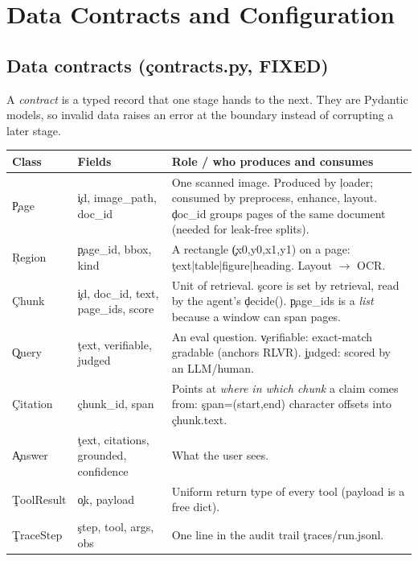 \chapter{Data Contracts and Configuration}
\section{Data contracts (\c{contracts.py}, FIXED)}
A \emph{contract} is a typed record that one stage hands to the next. They are Pydantic models, so invalid data raises an error at the boundary instead of corrupting a later stage.

\begin{longtable}{@{}p{2.3cm}p{5cm}p{7.2cm}@{}}
\toprule Class & Fields & Role / who produces and consumes \\ \midrule \endhead
\c{Page} & \c{id, image\_path, doc\_id} & One scanned image. Produced by \c{loader}; consumed by preprocess, enhance, layout. \c{doc\_id} groups pages of the same document (needed for leak-free splits). \\
\c{Region} & \c{page\_id, bbox, kind} & A rectangle \c{(x0,y0,x1,y1)} on a page: \c{text|table|figure|heading}. Layout $\to$ OCR. \\
\c{Chunk} & \c{id, doc\_id, text, page\_ids, score} & Unit of retrieval. \c{score} is set by retrieval, read by the agent's \c{decide()}. \c{page\_ids} is a \emph{list} because a window can span pages. \\
\c{Query} & \c{text, verifiable, judged} & An eval question. \c{verifiable}: exact-match gradable (anchors RLVR). \c{judged}: scored by an LLM/human. \\
\c{Citation} & \c{chunk\_id, span} & Points at \emph{where in which chunk} a claim comes from: \c{span=(start,end)} character offsets into \c{chunk.text}. \\
\c{Answer} & \c{text, citations, grounded, confidence} & What the user sees. \\
\c{ToolResult} & \c{ok, payload} & Uniform return type of every tool (payload is a free dict). \\
\c{TraceStep} & \c{step, tool, args, obs} & One line in the audit trail \c{traces/run.jsonl}. \\
\bottomrule\end{longtable}

